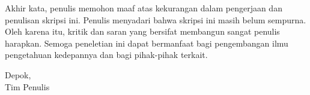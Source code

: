 Akhir kata, penulis memohon maaf atas kekurangan dalam pengerjaan dan penulisan skripsi ini. Penulis menyadari bahwa skripsi ini masih belum sempurna. Oleh karena itu, kritik dan saran yang bersifat membangun sangat penulis harapkan. Semoga peneletian ini dapat bermanfaat bagi pengembangan ilmu pengetahuan kedepannya dan bagi pihak-pihak terkait.
 

\vspace*{0.1cm}
\begin{flushright}
Depok, \tanggalSiapSidang\\[0.1cm]
\ifx\blank\npmDua
	\vspace*{1.5cm}
	\penulisSatu
\else
	Tim Penulis
\fi

\end{flushright}
